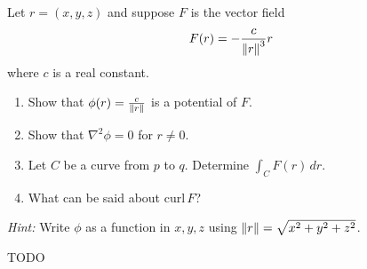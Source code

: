 \begin{exercise}
	Let $r = (x,y,z)$ and suppose $F$ is the vector field
	$$
		F(r) = - \frac{c}{\left\lVert r \right\rVert^3} r
	$$
	where $c$ is a real constant.
	\begin{enumerate}
		\item Show that $\phi(r) = \frac{c}{\left\lVert r \right\rVert}$ is a potential of $F$.

		\item Show that $\nabla^2 \phi = 0$ for $r \neq 0$.

		\item Let $C$ be a curve from $p$ to $q$. Determine $\int_C F(r) \, dr$.

		\item What can be said about $\mathrm{curl} \, F$?
	\end{enumerate}

	\emph{Hint:} Write $\phi$ as a function in $x, y, z$ using $\left\lVert r \right\rVert = \sqrt{x^2 + y^2 + z^2}$.
\end{exercise}

\begin{solution}
	TODO
\end{solution}
